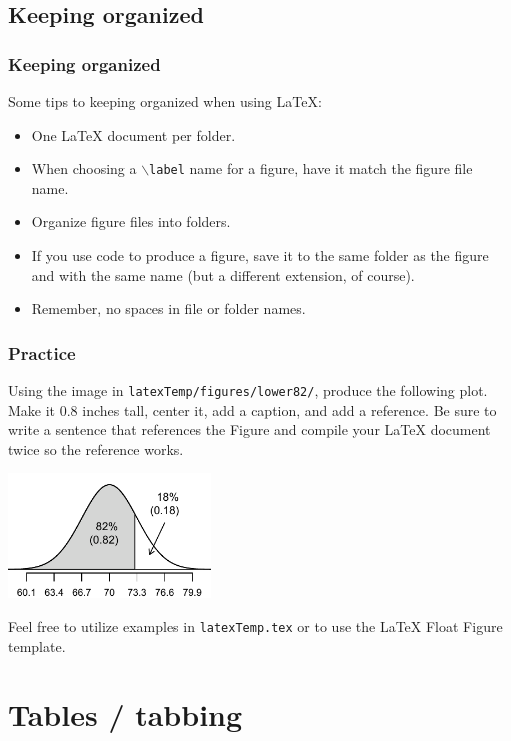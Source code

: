 \documentclass[slidestop,compress,mathserif]{beamer}
\begin{document}
\subsection[Keeping organized]{Keeping organized}
\begin{frame} \frametitle{Keeping organized}
Some tips to keeping organized when using LaTeX:
	\begin{itemize}
		\item One LaTeX document per folder.
		\item When choosing a \texttt{\color{command}$\backslash$label} name for a figure, have it match the figure file name.
		\item Organize figure files into folders.
		\item If you use code to produce a figure, save it to the same folder as the figure and with the same name (but a different extension, of course).
		\item Remember, no spaces in file or folder names.
	\end{itemize}
\end{frame}

\begin{frame}	\frametitle{Practice}
	
	Using the image in \texttt{\color{highlight}latexTemp/figures/lower82/}, produce the following plot. Make it 0.8 inches tall, center it, add a caption, and add a reference. Be sure to write a sentence that references the Figure and compile your LaTeX document twice so the reference works. \\
	
		\begin{center}
			\includegraphics[height=1.3in]{documents/latexTemp/figures/lower82/lower82}
		\end{center}
		
	Feel free to utilize examples in \texttt{\color{highlight}latexTemp.tex} or to use the LaTeX Float Figure template.
		
\end{frame}


\section[Tables / tabbing]{Tables / tabbing}
\end{document}
